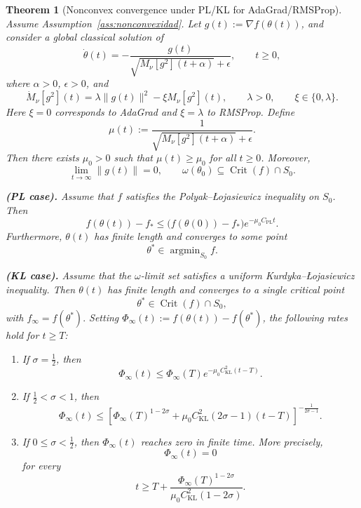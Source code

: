 \documentclass{article} %
\newtheorem{theorem}{Theorem}
\begin{document}
\begin{theorem}[Nonconvex convergence under PL/KL for AdaGrad/RMSProp]
\label{thm:nonconvex_PL_KL_adagrad_rmsprop}
Assume Assumption~\ref{ass:nonconvexidad}. Let $g(t):=\nabla f(\theta(t))$, and consider a global classical solution of
\begin{equation}
\label{eq:nonconvex_adagrad_rmsprop_theorem4}
    \dot\theta(t)
    =
    -
    \frac{g(t)}
    {\sqrt{M_\nu[g^2](t+\alpha)}+\epsilon},
    \qquad t\geq0,
\end{equation}
where \(\alpha>0\), \(\epsilon>0\), and
\[
    \dot M_\nu[g^2](t)
    =
    \lambda\|g(t)\|^2-\xi M_\nu[g^2](t),
    \qquad
    \lambda>0,
    \qquad
    \xi\in\{0,\lambda\}.
\]
Here \(\xi=0\) corresponds to AdaGrad and \(\xi=\lambda\) to RMSProp. Define
\[
    \mu(t)
    :=
    \frac{1}
    {\sqrt{M_\nu[g^2](t+\alpha)}+\epsilon}.
\]
Then there exists \(\mu_0>0\) such that $\mu(t)\geq\mu_0$ for all $t\geq0$. Moreover,
\[
    \lim_{t\to\infty}\|g(t)\|=0,
    \qquad
    \omega(\theta_0)\subseteq \operatorname{Crit}(f)\cap S_0.
\]

\medskip

\noindent\textbf{(PL case).}
Assume that \(f\) satisfies the Polyak--{\L}ojasiewicz inequality on \(S_0\). Then
\[
    f(\theta(t))-f_*
    \leq
    \bigl(f(\theta(0))-f_*\bigr)
    e^{-\mu_0 C_{\mathrm{PL}}t}.
\]
Furthermore, \(\theta(t)\) has finite length and converges to some point
\[
    \theta^*\in\operatorname{argmin}_{S_0}f.
\]

\medskip

\noindent\textbf{(KL case).}
Assume that the \(\omega\)-limit set satisfies a uniform Kurdyka--{\L}ojasiewicz inequality. Then \(\theta(t)\) has finite length and converges to a single critical point
\[
    \theta^*\in\operatorname{Crit}(f)\cap S_0,
\]
with $f_\infty=f(\theta^*).$ Setting $\Phi_\infty(t):=f(\theta(t))-f(\theta^*)$, the following rates hold for \(t\geq T\):

\begin{enumerate}
    \item If \(\sigma=\frac12\), then
    \[
        \Phi_\infty(t)
        \leq
        \Phi_\infty(T)
        e^{-\mu_0 C_{\mathrm{KL}}^2(t-T)}.
    \]

    \item If \(\frac12<\sigma<1\), then
    \[
        \Phi_\infty(t)
        \leq
        \left[
            \Phi_\infty(T)^{1-2\sigma}
            +
            \mu_0 C_{\mathrm{KL}}^2(2\sigma-1)(t-T)
        \right]^{-\frac1{2\sigma-1}}.
    \]

    \item If \(0\leq\sigma<\frac12\), then \(\Phi_\infty(t)\) reaches zero in finite time. More precisely,
    \[
        \Phi_\infty(t)=0
    \]
    for every
    \[
        t
        \geq
        T+
        \frac{\Phi_\infty(T)^{1-2\sigma}}
        {\mu_0 C_{\mathrm{KL}}^2(1-2\sigma)}.
    \]
\end{enumerate}
\end{theorem}
\end{document}

